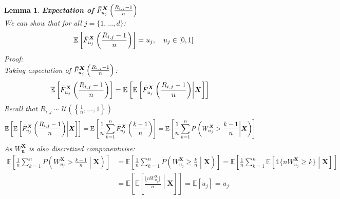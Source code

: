 \documentclass[12pt]{report}
\newtheorem{lemma}{Lemma}[subsection]
\newcommand{\1}{\mathbf{1}}
\begin{document}
\begin{flushleft}
\begin{lemma}\label{componentequalsu_j}
\textit{\normalfont\parencite{KojadinovicYi2024Smooth}}\:
\textbf{Expectation of} $\Bar{F}_{u_{j}}^{\boldsymbol{X}}\left(\frac{R_{i,j} - 1}{n}\right)$ \\
We can show that for all $j = \{1, \dots, d\}$: 
\begin{align*}
\mathbb{E} \left[ \Bar{F}_{u_{j}}^{\boldsymbol{X}}\left(\frac{R_{i,j} - 1}{n}\right) \right] = u_{j}, \quad u_{j} \in [0,1]
\end{align*}
Proof:\\
Taking expectation of $\Bar{F}_{u_{j}}^{\boldsymbol{X}}\left(\frac{R_{i,j} - 1}{n}\right)$:
\begin{align*}
\mathbb{E} \left[ \Bar{F}_{u_{j}}^{\boldsymbol{X}}\left(\frac{R_{i,j} - 1}{n}\right) \right] &= \mathbb{E} \left[ \mathbb{E} \left[ \Bar{F}_{u_{j}}^{\boldsymbol{X}}\left(\frac{R_{i,j} - 1}{n}\right) \middle| \boldsymbol{X} \right] \right]
\end{align*}
Recall that $R_{i,j} \sim \mathcal{U}\left(\left\{ \frac{1}{n}, \dots, 1 \right\}\right)$
\begin{align*}
\mathbb{E} \left[ \mathbb{E} \left[ \Bar{F}_{u_{j}}^{\boldsymbol{X}}\left(\frac{R_{i,j} - 1}{n}\right) \middle| \boldsymbol{X} \right] \right] &= \mathbb{E} \left[ \frac{1}{n} \sum\limits_{k = 1}^{n} \Bar{F}_{u_{j}}^{\boldsymbol{X}}\left(\frac{k - 1}{n}\right) \right] = \mathbb{E} \left[ \frac{1}{n} \sum\limits_{k = 1}^{n} P \left( W^{\boldsymbol{X}}_{u_{j}} > \frac{k - 1}{n} \middle| \boldsymbol{X} \right) \right]
\end{align*}
As $W^{\boldsymbol{X}}_{\boldsymbol{u}}$ is also discretized componentwise:
\begin{align*}
\mathbb{E} \left[ \frac{1}{n} \sum\limits_{k = 1}^{n} P \left( W^{\boldsymbol{X}}_{u_{j}} > \frac{k - 1}{n} \middle| \boldsymbol{X} \right) \right] &= \mathbb{E} \left[ \frac{1}{n} \sum\limits_{k = 1}^{n} P \left( W^{\boldsymbol{X}}_{u_{j}} \ge \frac{k}{n} \middle| \boldsymbol{X} \right) \right] = \mathbb{E} \left[ \frac{1}{n} \sum\limits_{k = 1}^{n} \mathbb{E} \left[ \mathds{1}\{ nW^{\boldsymbol{X}}_{u_{j}} \ge k \} \middle| \boldsymbol{X} \right] \right] \\ &= \mathbb{E} \left[ \mathbb{E} \left[ \frac{\lfloor nW^{\boldsymbol{X}}_{u_{j}} \rfloor}{n} \middle| \boldsymbol{X} \right] \right] = \mathbb{E} \left[ u_{j} \right] = u_{j}
\end{align*}
\end{lemma}


\end{flushleft}
\end{document}
